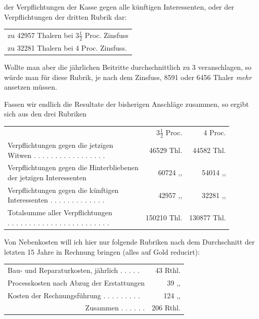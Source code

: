 der Verpflichtungen der Kasse gegen alle künftigen Interessenten, oder der Verpflichtungen der dritten Rubrik dar:
\begin{center}
\begin{tabular}{l}
zu 42957 Thalern bei \(3\tfrac{1}{2}\) Proc. Zinsfuss\\
zu 32281 Thalern bei 4 Proc. Zinsfuss.
\end{tabular}
\end{center}
\noindent\hspace*{\parindent}Wollte man aber die jährlichen Beitritte durchschnittlich zu 3 veranschlagen, so würde man für diese Rubrik, je nach dem Zinsfuss, 8591 oder 6456 Thaler \textit{mehr} ansetzen müssen.

Fassen wir endlich die Resultate der bisherigen Anschläge zusammen, so ergibt sich aus den drei Rubriken
\begin{center}
\footnotesize\setlength{\tabcolsep}{3pt}
\begin{tabular}{l r|r}
&\(3\tfrac{1}{2}\) Proc.&4 Proc.\\
\shortstack[l]{Verpflichtungen gegen die jetzigen\\Witwen . . . . . . . . . . . . . . . . .}&46529 Thl.&44582 Thl.\\
\shortstack[l]{Verpflichtungen gegen die Hinterbliebenen\\der jetzigen Interessenten}&60724 ,, &54014 ,, \\
\shortstack[l]{Verpflichtungen gegen die künftigen\\Interessenten . . . . . . . . . . . . .}&42957 ,, &32281 ,, \\\cline{2-3}
\shortstack[l]{Totalsumme aller Verpflichtungen\\ . . . . . . . . . . . . . . . . . . . . . . . .}&150210 Thl.&130877 Thl.
\end{tabular}
\end{center}
\noindent\hspace*{\parindent}Von Nebenkosten will ich hier nur folgende Rubriken nach dem Durchschnitt der letzten 15 Jahre in Rechnung bringen (alles auf Gold reducirt):
\begin{center}
\small\setlength{\tabcolsep}{3pt}
\begin{tabular}{l r}
Bau- und Reparaturkosten, jährlich . . . . .&43 Rthl.\\
Processkosten nach Abzug der Erstattungen&39 ,, \\
Kosten der Rechnungsführung . . . . . . . . .&124 ,, \\\cline{2-2}
\multicolumn{1}{r}{Zusammen . . . . . .}&206 Rthl.
\end{tabular}
\end{center}
